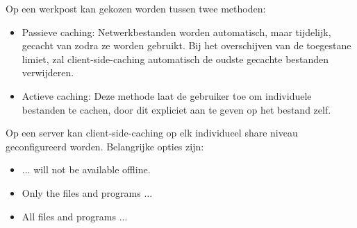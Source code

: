 \begin{enumerate}
{\begin{itemize}
                Op een werkpost kan gekozen worden tussen twee methoden:
                \begin{itemize}
                    \item Passieve caching: Netwerkbestanden worden automatisch, maar tijdelijk, gecacht van zodra ze worden gebruikt. Bij het overschijven van de toegestane limiet, zal client-side-caching automatisch de oudste gecachte bestanden verwijderen.
                    \item Actieve caching: Deze methode laat de gebruiker toe om individuele bestanden te cachen, door dit expliciet aan te geven op het bestand zelf.
                \end{itemize}

                Op een server kan client-side-caching op elk individueel share niveau geconfigureerd worden. Belangrijke opties zijn:
                \begin{itemize}
                    \item ... will not be available offline.
                    \item Only the files and programs ...
                    \item All files and programs ...
                \end{itemize}
			\end{itemize}
		}
		
		 { }
		

\end{enumerate}
